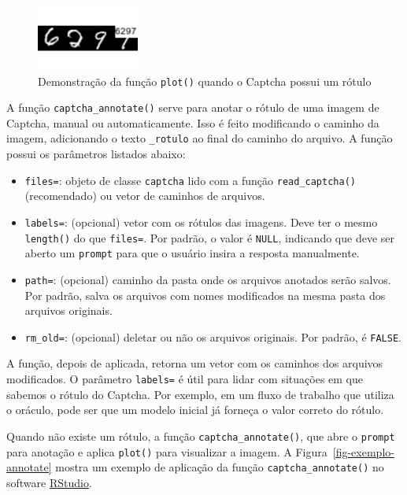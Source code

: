 \documentclass[12pt,twoside,brazilian]{book}
\providecommand{\tightlist}{%
  \setlength{\itemsep}{0pt}\setlength{\parskip}{0pt}}
\begin{document}
\begin{figure}[H]

{\centering \includegraphics[width=0.3\textwidth,height=\textheight]{./resultados_files/figure-pdf/fig-exemplo-plot-rotulado-1.pdf}

}

\caption{\label{fig-exemplo-plot-rotulado}Demonstração da função
\texttt{plot()} quando o Captcha possui um rótulo}

\end{figure}

A função \texttt{captcha\_annotate()} serve para anotar o rótulo de uma
imagem de Captcha, manual ou automaticamente. Isso é feito modificando o
caminho da imagem, adicionando o texto \texttt{\_rotulo} ao final do
caminho do arquivo. A função possui os parâmetros listados abaixo:

\begin{itemize}
\tightlist
\item
  \texttt{files=}: objeto de classe \texttt{captcha} lido com a função
  \texttt{read\_captcha()} (recomendado) ou vetor de caminhos de
  arquivos.
\item
  \texttt{labels=}: (opcional) vetor com os rótulos das imagens. Deve
  ter o mesmo \texttt{length()} do que \texttt{files=}. Por padrão, o
  valor é \texttt{NULL}, indicando que deve ser aberto um
  \texttt{prompt} para que o usuário insira a resposta manualmente.
\item
  \texttt{path=}: (opcional) caminho da pasta onde os arquivos anotados
  serão salvos. Por padrão, salva os arquivos com nomes modificados na
  mesma pasta dos arquivos originais.
\item
  \texttt{rm\_old=}: (opcional) deletar ou não os arquivos originais.
  Por padrão, é \texttt{FALSE}.
\end{itemize}

A função, depois de aplicada, retorna um vetor com os caminhos dos
arquivos modificados. O parâmetro \texttt{labels=} é útil para lidar com
situações em que sabemos o rótulo do Captcha. Por exemplo, em um fluxo
de trabalho que utiliza o oráculo, pode ser que um modelo inicial já
forneça o valor correto do rótulo.

Quando não existe um rótulo, a função \texttt{captcha\_annotate()}, que
abre o \texttt{prompt} para anotação e aplica \texttt{plot()} para
visualizar a imagem. A Figura~\ref{fig-exemplo-annotate} mostra um
exemplo de aplicação da função \texttt{captcha\_annotate()} no software
\href{https://posit.co/download/rstudio-desktop/}{RStudio}.
\end{document}
